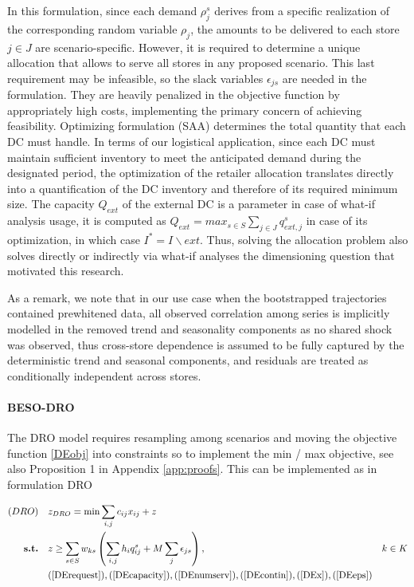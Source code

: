 \documentclass[mnsc,sglanonrev]{informs4}  %
\theoremstyle{remark}\newtheorem{remark}{Remark}
\begin{document}
In this formulation, since each demand $\rho_j^s$ derives from a specific realization of the corresponding random variable $\rho_j$, the amounts to be delivered to each store $j \in J$ are scenario-specific. However, it is required to determine a unique allocation that allows to serve all stores in any proposed scenario. This last requirement may be infeasible, so the slack variables $\epsilon_{js}$ are needed in the formulation. They are heavily penalized in the objective function by appropriately high costs, implementing the primary concern of achieving feasibility.
Optimizing formulation (SAA) determines the total quantity that each DC must handle. In terms of our logistical application, since each DC must maintain sufficient inventory to meet the anticipated demand during the designated period, the optimization of the retailer allocation translates directly into a quantification of the DC inventory and therefore of its required minimum size. The capacity $Q_{ext}$ of the external DC is a parameter in case of what-if analysis usage, it is computed as $Q_{ext} = max_{s\in S} \sum_{j\in J} q_{ext,j}^s$ in case of its optimization, in which case $I^* = I\backslash ext$. Thus, solving the allocation problem also solves directly or indirectly via what-if analyses the dimensioning question that motivated this research.

As a remark, we note that in our use case when the bootstrapped trajectories contained prewhitened data, all observed correlation among series is implicitly modelled in the removed trend and seasonality components as no shared shock was observed, thus cross-store dependence is assumed to be fully captured by the deterministic trend and seasonal components, and residuals are treated as conditionally independent across stores. 

\paragraph{BESO-DRO}

The DRO model requires resampling among scenarios and moving the objective function \ref{DEobj} into constraints so to implement the min / max objective, see also Proposition 1 in Appendix \ref{app:proofs}. This can be implemented as in formulation DRO

\begin{align}
  (DRO)\quad& z_{DRO} = \min \sum_{i,j}c_{ij}x_{ij}+z \\
   \textbf{s.t.}\quad
   &z\ge \sum_{s\in S}w_{ks}
   \left( \sum_{i,j}h_iq_{ij}^{s}+M\sum_j\epsilon_{js} \right), & k\in K   \label{DRO1j}\\
   & (\ref{DErequest}), (\ref{DEcapacity}), (\ref{DEnumserv}), (\ref{DEcontin}), (\ref{DEx}), (\ref{DEeps})
\end{align}
\end{document}
